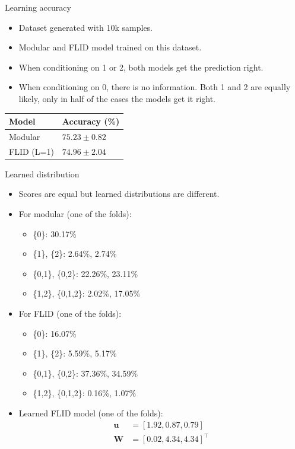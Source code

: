 \documentclass{beamer}
\begin{document}
\begin{frame}{Learning accuracy}
  \begin{itemize}
    \item Dataset generated with 10k samples.
    \item Modular and FLID model trained on this dataset.
    \item When conditioning on 1 or 2, both models get the prediction right.
    \item When conditioning on 0, there is no information. Both 1 and 2 are equally likely, only in half of the cases the models get it right.
  \end{itemize}
  \begin{table}
    \centering
    \begin{tabular}{@{}ll@{}}
      \hline
      \textbf{Model} & \textbf{Accuracy (\%)}\\
      \hline
      Modular & $75.23 \pm 0.82$ \\
      FLID (L=1) & $74.96 \pm 2.04$ \\
      \hline
    \end{tabular}
  \end{table}
\end{frame}

\begin{frame}{Learned distribution}
  \begin{itemize}
    \item Scores are equal but learned distributions are different.
    \item For modular (one of the folds):
      \begin{itemize}
        \item \{0\}: 30.17\%
        \item \{1\}, \{2\}: 2.64\%, 2.74\%
        \item \{0,1\}, \{0,2\}: 22.26\%, 23.11\%
        \item \{1,2\}, \{0,1,2\}: 2.02\%, 17.05\%
      \end{itemize}
    \item For FLID (one of the folds):
      \begin{itemize}
        \item \{0\}: 16.07\%
        \item \{1\}, \{2\}: 5.59\%, 5.17\%
        \item \{0,1\}, \{0,2\}: 37.36\%, 34.59\%
        \item \{1,2\}, \{0,1,2\}: 0.16\%, 1.07\%
      \end{itemize}
    \item Learned FLID model (one of the folds):
      \begin{align*}
        \mathbf{u} &= [1.92, 0.87, 0.79] \\
        \mathbf{W} &= [0.02, 4.34, 4.34]^\intercal
      \end{align*}
  \end{itemize}
\end{frame}
\end{document}
